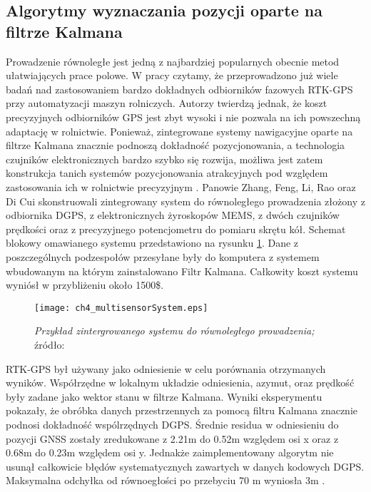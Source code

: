 \subsection{Algorytmy wyznaczania pozycji oparte na filtrze Kalmana}
Prowadzenie równoległe jest jedną z najbardziej popularnych obecnie metod ułatwiających prace polowe.
W pracy \cite{CCTA5_461_469} czytamy, że przeprowadzono już wiele badań nad zastosowaniem bardzo dokładnych odbiorników fazowych RTK-GPS
przy automatyzacji maszyn rolniczych. Autorzy twierdzą jednak, że koszt precyzyjnych odbiorników GPS jest zbyt wysoki
i nie pozwala na ich powszechną adaptację w rolnictwie. Ponieważ, zintegrowane systemy nawigacyjne oparte na filtrze Kalmana
znacznie podnoszą dokładność pozycjonowania, a technologia czujników elektronicznych bardzo szybko się rozwija,
możliwa jest zatem konstrukcja tanich systemów pozycjonowania atrakcyjnych pod względem zastosowania ich w rolnictwie precyzyjnym \cite{CCTA5_461_469}.
Panowie Zhang, Feng, Li, Rao oraz Di Cui skonstruowali zintegrowany system do równoległego prowadzenia złożony z odbiornika DGPS,
z elektronicznych żyroskopów MEMS, z dwóch czujników prędkości oraz z precyzyjnego potencjometru do pomiaru skrętu kół.
Schemat blokowy omawianego systemu przedstawiono na rysunku \ref{fig:ch4_multisensorSystem}.
Dane z poszczególnych podzespołów przesyłane były do komputera z systemem wbudowanym na którym zainstalowano Filtr Kalmana.
Całkowity koszt systemu wyniósł w przybliżeniu około 1500\$.
\begin{figure}[H]
\centering
\texttt{[image: ch4\_multisensorSystem.eps]}
\caption{\textit{Przykład zintergrowanego systemu do równoległego prowadzenia;} 
źródło: \cite[][strona 464]{CCTA5_461_469}}
\label{fig:ch4_multisensorSystem}
\end{figure}   
RTK-GPS był używany jako odniesienie w celu porównania otrzymanych wyników. 
Współrzędne w lokalnym układzie odniesienia, azymut, oraz prędkość były zadane jako wektor stanu w filtrze Kalmana.
Wyniki eksperymentu pokazały, że obróbka danych przestrzennych za pomocą filtru Kalmana znacznie podnosi dokładność wspólrzędnych DGPS.
Średnie residua w odniesieniu do pozycji GNSS zostały zredukowane z 2.21m do 0.52m względem osi x oraz z 0.68m do 0.23m względem osi y.
Jednakże zaimplementowany algorytm nie usunął całkowicie błędów systematycznych zawartych w danych kodowych DGPS.
Maksymalna odchyłka od równoegłości po przebyciu 70 m wyniosła 3m \cite{CCTA5_461_469}.

